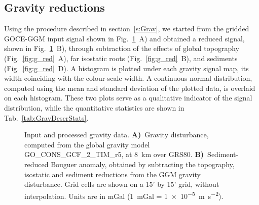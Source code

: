 {\subsection{Gravity reductions}
\label{ss:Appl:DiscGravReductions}

Using the procedure described in section~\ref{s:Grav}, we started from the gridded GOCE-GGM input signal shown in Fig.~\ref{fig:GGMmerged}~A) and obtained a reduced signal, shown in Fig.~\ref{fig:GGMmerged}~B), through subtraction of the effects of global topography (Fig.~\ref{fig:g_red}~A), far isostatic roots (Fig.~\ref{fig:g_red}~B), and sediments (Fig.~\ref{fig:g_red}~D).
A histogram is plotted under each gravity signal map, its width coinciding with the colour-scale width.
A continuous normal distribution, computed using the mean and standard deviation of the plotted data, is overlaid on each histogram.
These two plots serve as a qualitative indicator of the signal distribution, while the quantitative statistics are shown in Tab.~\ref{tab:GravDescrStats}.

\begin{figure}
    \begin{adjustbox}{center}
    \end{adjustbox}
	\caption{Input and processed gravity data.
	\textbf{A)}~Gravity disturbance, computed from the global gravity model {GO\_CONS\_GCF\_2\_TIM\_r5}, at \SI{8}{\kilo \metre} over GRS80.
	\textbf{B)}~Sediment-reduced Bouguer anomaly, obtained by subtracting the topography, isostatic and sediment reductions from the GGM gravity disturbance.
	Grid cells are shown on a 15' by 15' grid, without interpolation. Units are in mGal (\SI{1}{mGal} = \SI{1e-5}{\metre \per \square \second}).}
	\label{fig:GGMmerged}
\end{figure}

}
